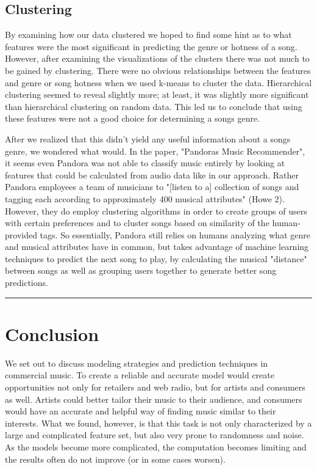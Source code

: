\documentclass[12pt]{article}
\newcommand{\horizontalLine}{
	\begin{center}
		\hrule width 1.0\textwidth
	\end{center}
}
\begin{document}
\subsection{Clustering}
\label{subsec:clusteringDisc}
By examining how our data clustered we hoped to find some hint as to what features were the most significant in predicting the genre or hotness of a song.
However, after examining the visualizations of the clusters there was not much to be gained by clustering. There were no obvious relationships between
the features and genre or song hotness when we used k-means to cluster the data. Hierarchical clustering seemed to reveal slightly more; at least, it was slightly more significant than hierarchical clustering on random data. This led us to conclude that using these features were not a good choice for 
determining a songs genre. 

After we realized that this didn't yield any useful information about a songs genre, we wondered what would. In the paper, "Pandoras Music
Recommender", it seems even Pandora was not able to classify music entirely by looking at features that could be calculated from audio data like in 
our approach. Rather Pandora employees a team of musicians to "[listen to a] collection of songs and tagging each according to
approximately 400 musical attributes" (Howe 2). However, they do employ clustering algorithms in order to create groups of users with certain preferences and
to cluster songs based on similarity of the human-provided tags.
So essentially, Pandora still relies on humans analyzing what genre and musical attributes have in common, but takes advantage of machine learning techniques
to predict the next song to play, by calculating the musical "distance" between songs as well as grouping users together to generate better song predictions.
\horizontalLine
\section{Conclusion}
\label{sec:conclusion}
We set out to discuss modeling strategies and prediction techniques in commercial music. To create a reliable and accurate model would create opportunities not only for retailers and web radio, but for artists and consumers as well. Artists could better tailor their music to their audience, and consumers would have an accurate and helpful way of finding music similar to their interests. What we found, however, is that this task is not only characterized by a large and complicated feature set, but also very prone to randomness and noise. As the models become more complicated, the computation becomes limiting and the results often do not improve (or in some cases worsen).
\end{document}
